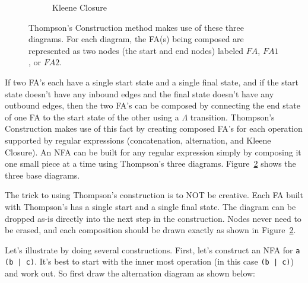 \documentclass[letterpaper,12pt,openany,reqno]{book}%
\newcommand{\code}[1] {\lstinline[breaklines=yes,breakatwhitespace=yes]{#1}}
\newcommand{\fatransition}[3] {\draw [-{Latex[length=3mm,width=2.5mm]}] (#1) -- (#2) node [midway, above] {#3};}
\newcommand{\faarctransition}[5] {\draw [-{Latex[length=3mm,width=2.5mm]}] (#1) to[out=#4, in=#5] node  [midway, above] {#3} (#2) ;}
\begin{document}
\begin{figure}[htb]
\begin{subfigure}[b]{0.45\textwidth}
\caption{Kleene Closure}\label{F.Thompsons.KleeneClosure}
\end{subfigure}

 \caption[Thompson's Construction]{Thompson's Construction method makes use of these three diagrams. For each diagram, the FA(s) being composed are represented as two nodes (the start and end nodes) labeled $FA$, $FA 1$, or $FA 2$.}
  \label{F.Thompsons}
\end{figure}

If two FA's each have a single start state and a single final state, and if the start state doesn't have any inbound edges and the final state doesn't have any outbound edges, then the two FA's can be composed by connecting the end state of one FA to the start state of the other using a $\Lambda$ transition. Thompson's Construction makes use of this fact by creating composed FA's for each operation supported by regular expressions (concatenation, alternation, and Kleene Closure). An NFA can be built for any regular expression simply by composing it one small piece at a time using Thompson's three diagrams. Figure~\ref{F.Thompsons} shows the three base diagrams.

The trick to using Thompson's construction is to NOT be creative. Each FA built with Thompson's has a single start and a single final state. The diagram can be dropped as-is directly into the next step in the construction. Nodes never need to be erased, and each composition should be drawn exactly as shown in Figure~\ref{F.Thompsons}.

Let's illustrate by doing several constructions. First, let's construct an NFA for \code{a (b | c)}. It's best to start with the inner most operation (in this case \code{(b | c)}) and work out. So first draw the alternation diagram as shown below:
\end{document}
